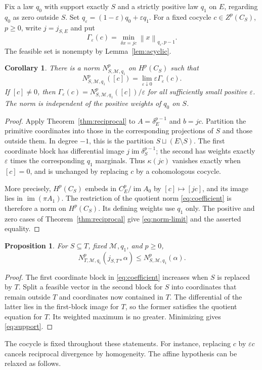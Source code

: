 \documentclass[11pt,a4paper]{article}
\numberwithin{equation}{section}
\newtheorem{proposition}[theorem]{Proposition}
\newtheorem{corollary}[theorem]{Corollary}
\theoremstyle{remark}
\newcommand{\M}{\mathcal M}
\newcommand{\im}{\operatorname{im}}
\newcommand{\norm}[1]{\left\lVert #1\right\rVert}
\begin{document}
Fix a law $q_0$ with support exactly $S$ and a strictly positive law $q_1$ on $E$, regarding $q_0$ as zero outside $S$. Set $q_\varepsilon=(1-\varepsilon)q_0+\varepsilon q_1$. For a fixed cocycle $c\in Z^p(C_S)$, $p\ge0$, write $j=j_{S,E}$ and put
\begin{equation}\label{eq:primitive}
 \Gamma_\varepsilon(c)=\min_{\delta x=jc}\norm{x}_{q_\varepsilon,p-1}.
\end{equation}
The feasible set is nonempty by Lemma~\ref{lem:acyclic}.

\begin{corollary}\label{cor:obstruction}
There is a norm $N^p_{S,\M,q_1}$ on $H^p(C_S)$ such that
\begin{equation}\label{eq:norm-limit}
 N^p_{S,\M,q_1}([c])=\lim_{\varepsilon\downarrow0}\varepsilon\Gamma_\varepsilon(c).
\end{equation}
If $[c]\ne0$, then $\Gamma_\varepsilon(c)=N^p_{S,\M,q_1}([c])/\varepsilon$ for all sufficiently small positive $\varepsilon$. The norm is independent of the positive weights of $q_0$ on $S$.
\end{corollary}
\begin{proof}
Apply Theorem~\ref{thm:reciprocal} to $A=\delta_E^{p-1}$ and $b=jc$. Partition the primitive coordinates into those in the corresponding projections of $S$ and those outside them. In degree $-1$, this is the partition $S\sqcup(E\setminus S)$. The first coordinate block has differential image $j\im\delta_S^{p-1}$; the second has weights exactly $\varepsilon$ times the corresponding $q_1$ marginals. Thus $\kappa(jc)$ vanishes exactly when $[c]=0$, and is unchanged by replacing $c$ by a cohomologous cocycle.

More precisely, $H^p(C_S)$ embeds in $C_E^p/\im A_0$ by $[c]\mapsto[jc]$, and its image lies in $\im(\pi A_1)$. The restriction of the quotient norm \eqref{eq:coefficient} is therefore a norm on $H^p(C_S)$. Its defining weights use $q_1$ only. The positive and zero cases of Theorem~\ref{thm:reciprocal} give \eqref{eq:norm-limit} and the asserted equality.
\end{proof}

\begin{proposition}\label{prop:support}
For $S\subseteq T$, fixed $\M,q_1$, and $p\ge0$,
\begin{equation}\label{eq:support}
 N^p_{T,\M,q_1}(j_{S,T*}\alpha)\le N^p_{S,\M,q_1}(\alpha).
\end{equation}
\end{proposition}
\begin{proof}
The first coordinate block in \eqref{eq:coefficient} increases when $S$ is replaced by $T$. Split a feasible vector in the second block for $S$ into coordinates that remain outside $T$ and coordinates now contained in $T$. The differential of the latter lies in the first-block image for $T$, so the former satisfies the quotient equation for $T$. Its weighted maximum is no greater. Minimizing gives \eqref{eq:support}.
\end{proof}
The cocycle is fixed throughout these statements. For instance, replacing $c$ by $\varepsilon c$ cancels reciprocal divergence by homogeneity. The affine hypothesis can be relaxed as follows.
\end{document}
